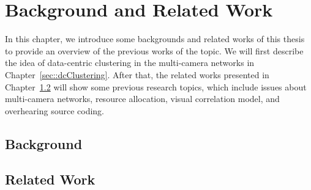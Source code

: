 \section{Background and Related Work}
\label{sec::backgroundAndRelatedWork}
In this chapter, we introduce some backgrounds and related works of this thesis to provide an overview of the previous works of the topic.
We will first describe the idea of data-centric clustering in the multi-camera networks in Chapter~\ref{sec::dcClustering}.
After that, the related works presented in Chapter~\ref{sec::relatedWork} will show some previous research topics, which include issues about multi-camera networks, resource allocation, visual correlation model, and overhearing source coding.
%
\subsection{Background}
\label{sec::background}

%
\subsection{Related Work}
\label{sec::relatedWork}
